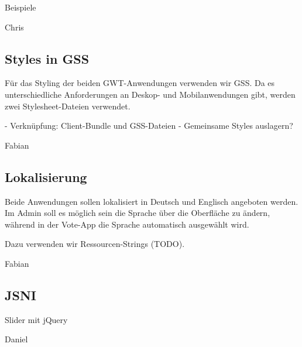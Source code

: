 Beispiele

Chris

\subsection{Styles in GSS}
Für das Styling der beiden GWT-Anwendungen verwenden wir GSS. Da es unterschiedliche Anforderungen
an Deskop- und Mobilanwendungen gibt, werden zwei Stylesheet-Dateien verwendet.

- Verknüpfung: Client-Bundle und GSS-Dateien
- Gemeinsame Styles auslagern?

Fabian

\subsection{Lokalisierung}
Beide Anwendungen sollen lokalisiert in Deutsch und Englisch angeboten werden.
Im Admin soll es möglich sein die Sprache über die Oberfläche zu ändern, während
in der Vote-App die Sprache automatisch ausgewählt wird.

Dazu verwenden wir Ressourcen-Strings (TODO).

Fabian

\subsection{JSNI}
Slider mit jQuery

Daniel